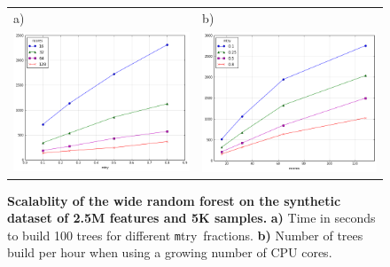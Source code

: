 \documentclass[10pt,letterpaper]{article}
\newcommand{\mtry}{{\texttt mtry}}
\begin{document}
\begin{figure}[tbhp]
\begin{adjustwidth}{-1.00in}{0in}
\begin{tabular}{ll}
a)& b)\\
\includegraphics[totalheight=6cm]{./figs/mtry_cpu.png} & 
\includegraphics[totalheight=6cm]{./figs/cpu_mtry_trees_per_hour.png} \\
\end{tabular}
\caption{{\bf Scalablity of the wide random forest on the synthetic dataset of 2.5M features and 5K samples.} 
  {\bf a)} Time in seconds to build 100 trees for different \mtry\ fractions. 
  {\bf b)} Number of trees build per hour when using a growing number of CPU cores.}
\label{figure:synth}
\end{adjustwidth}
\end{figure}
\end{document}
